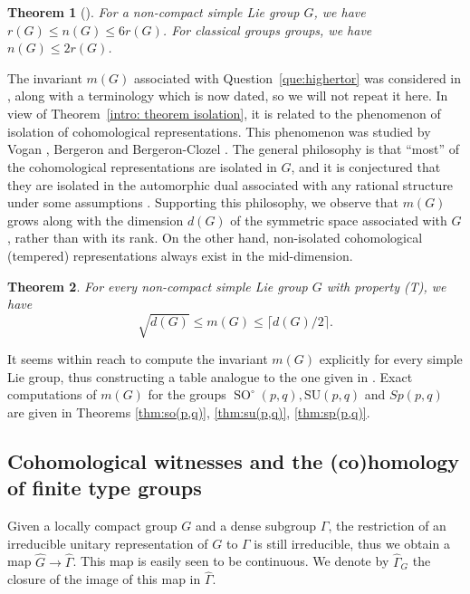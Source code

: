 \documentclass[12pt,reqno]{amsart}
\newtheorem{mainthm}{Theorem}
\theoremstyle{definition}
\newcommand{\SO}{\operatorname{SO}}
\begin{document}
\begin{mainthm}[{\cite[Theorem B and Appendix A]{BaderSauer}}] \label{intro:Lie-n}
 For a non-compact simple Lie group $G$, we have $r(G)\leq n(G) \leq 6r(G)$. For classical groups groups, we have $n(G) \leq 2r(G)$.
\end{mainthm}

The invariant $m(G)$ associated with Question~\ref{que:highertor} was considered in \cite[Definition 30]{BaderNowakDeformation}, along with a terminology which is now dated, so we will not repeat it here.
In view of Theorem~\ref{intro: theorem isolation}, it is related to the phenomenon of isolation of cohomological representations.
This phenomenon was studied by Vogan \cite{voganIsol}, Bergeron \cite{BergeronIsolation, BergeronLefschetz} and Bergeron-Clozel \cite[Section~5.4]{BergeronClozel}. The general philosophy is that ``most'' of the cohomological representations are isolated in $\widehat{G}$, and it is conjectured that they are isolated in the automorphic dual associated with any rational structure under some assumptions \cite[Conjecture~3.1]{BergeronIsolation}. 
Supporting this philosophy, we observe that $m(G)$ grows along with the dimension $d(G)$ of the symmetric space associated with $G$, rather than with its rank. 
On the other hand, non-isolated cohomological (tempered) representations always exist in the mid-dimension.

\begin{mainthm} \label{intro:Lie-m}
    For every non-compact simple Lie group $G$ with property (T),
    we have 
    \[ \sqrt{d(G)} \leq m(G) \leq \lceil d(G)/2 \rceil. \]
\end{mainthm}

It seems within reach to compute the invariant $m(G)$ explicitly for every 
simple Lie group, thus constructing a table analogue to the one given in \cite[Appendix A]{BaderSauer}. Exact computations of $m(G)$ for the groups $\SO^\circ(p,q), \mathrm{SU}(p,q)$ and $Sp(p,q)$ are given in Theorems \ref{thm:so(p,q)}, \ref{thm:su(p,q)}, \ref{thm:sp(p,q)}.



\subsection{Cohomological witnesses and the (co)homology of finite type groups}

Given a locally compact group $G$ and a dense subgroup $\Gamma$,
the restriction of an irreducible unitary representation of $G$ to $\Gamma$ is still irreducible, thus we obtain a map $\widehat{G}\to \widehat{\Gamma}$.
This map is easily seen to be continuous.
We denote by $\widehat{\Gamma}_G$ the closure of the image of this map in $\widehat{\Gamma}$.
\end{document}
